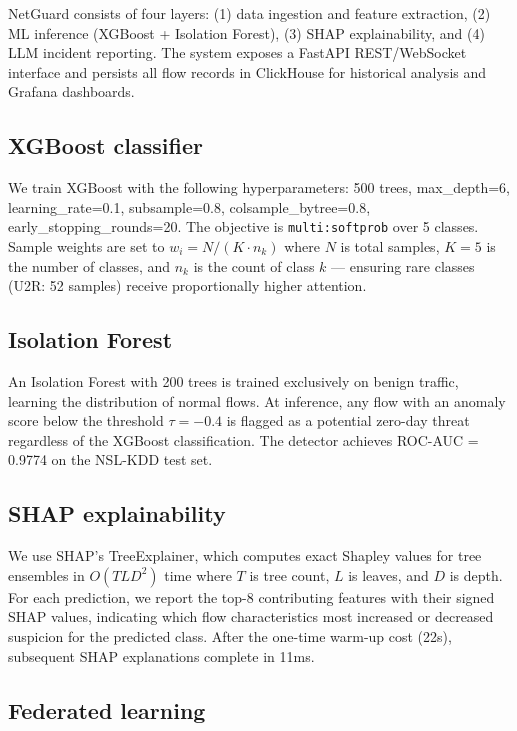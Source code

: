 \documentclass[review]{elsarticle}  %
\begin{document}
NetGuard consists of four layers: (1) data ingestion and feature
extraction, (2) ML inference (XGBoost + Isolation Forest),
(3) SHAP explainability, and (4) LLM incident reporting.
The system exposes a FastAPI REST/WebSocket interface and
persists all flow records in ClickHouse for historical analysis
and Grafana dashboards.

\subsection{XGBoost classifier}

We train XGBoost with the following hyperparameters: 500 trees,
max\_depth=6, learning\_rate=0.1, subsample=0.8,
colsample\_bytree=0.8, early\_stopping\_rounds=20.
The objective is \texttt{multi:softprob} over 5 classes.
Sample weights are set to $w_i = N / (K \cdot n_k)$ where
$N$ is total samples, $K=5$ is the number of classes, and
$n_k$ is the count of class $k$ — ensuring rare classes
(U2R: 52 samples) receive proportionally higher attention.

\subsection{Isolation Forest}

An Isolation Forest with 200 trees is trained exclusively on
benign traffic, learning the distribution of normal flows.
At inference, any flow with an anomaly score below the
threshold $\tau = -0.4$ is flagged as a potential zero-day
threat regardless of the XGBoost classification.
The detector achieves ROC-AUC = 0.9774 on the NSL-KDD test set.

\subsection{SHAP explainability}

We use SHAP's TreeExplainer, which computes exact Shapley values
for tree ensembles in $O(TLD^2)$ time where $T$ is tree count,
$L$ is leaves, and $D$ is depth. For each prediction, we report
the top-8 contributing features with their signed SHAP values,
indicating which flow characteristics most increased or decreased
suspicion for the predicted class. After the one-time warm-up
cost (22s), subsequent SHAP explanations complete in 11ms.

\subsection{Federated learning}
\end{document}
